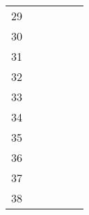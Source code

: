 \begin{table}[ht]
\begin{tabular}{c|lllll}
    29                       &                                          &                                           &                                                &                                    &                                      \\
    30                       &                                          &                                           &                                                &                                    &                                      \\
    31                       &                                          &                                           &                                                &                                    &                                      \\
    32                       &                                          &                                           &                                                &                                    &                                      \\
    33                       &                                          &                                           &                                                &                                    &                                      \\
    34                       &                                          &                                           &                                                &                                    &                                      \\
    35                       &                                          &                                           &                                                &                                    &                                      \\
    36                       &                                          &                                           &                                                &                                    &                                      \\
    37                       &                                          &                                           &                                                &                                    &                                      \\
    38                       &                                          &                                           &                                                &                                    &                                      \\

\end{tabular}
\end{table}
